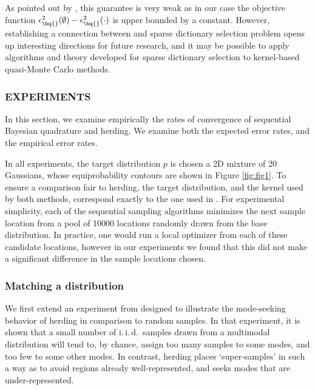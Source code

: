 As pointed out by \citet{KrauseCevher10}, this guarantee is very weak as in our case the objective function $\epsilon^{2}_{\bq{}}(\emptyset)-\epsilon^{2}_{\bq{}}(\cdot)$ is upper bounded by a constant. However, establishing a connection between \sbq{} and sparse dictionary selection problem opens up interesting directions for future research, and it may be possible to apply algorithms and theory developed for sparse dictionary selection to kernel-based quasi-Monte Carlo methods.

\subsubsection{EXPERIMENTS}
\label{sec:experiments}

In this section, we examine empirically the rates of convergence of sequential Bayesian quadrature and herding.  We examine both the expected error rates, and the empirical error rates.

In all experiments, the target distribution $p$ is chosen a 2D mixture of 20 Gaussians, whose equiprobability contours are shown in Figure \ref{fig:fig1}. To ensure a comparison fair to herding, the target distribution, and the kernel used by both methods, correspond exactly to the one used in \citep[Fig. 1]{chen2010super}. %
%
For experimental simplicity, each of the sequential sampling algorithms minimizes the next sample location from a pool of 10000 locations randomly drawn from the base distribution. In practice, one would run a local optimizer from each of these candidate locations, however in our experiments we found that this did not make a significant difference in the sample locations chosen. 

\subsubsection{Matching a distribution}

We first extend an experiment from \citep{chen2010super} designed to illustrate the mode-seeking behavior of herding in comparison to random samples. In that experiment, %
it is shown that a small number of i.\,i.\,d.\ samples drawn from a multimodal distribution will tend to, by chance, assign too many samples to some modes, and too few to some other modes. In contrast, herding places `super-samples' in such a way as to avoid regions already well-represented, and seeks modes that are under-represented.

